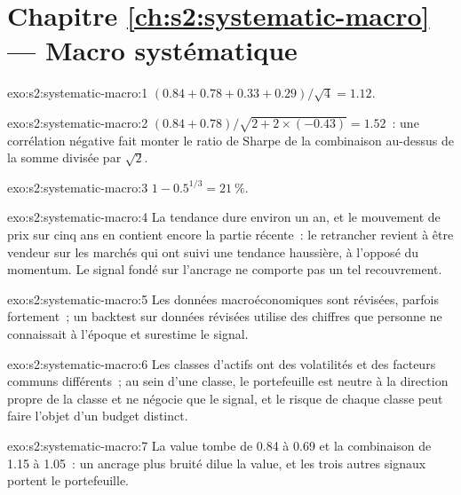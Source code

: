 \section*{Chapitre \ref{ch:s2:systematic-macro} --- Macro systématique}

\begin{solution}{exo:s2:systematic-macro:1}
$(0.84 + 0.78 + 0.33 + 0.29)/\sqrt4 = 1.12$.
\end{solution}

\begin{solution}{exo:s2:systematic-macro:2}
$(0.84 + 0.78)/\sqrt{2 + 2 \times (-0.43)} = 1.52$~: une corrélation négative fait monter le ratio de Sharpe de la combinaison au-dessus de la somme divisée par $\sqrt2$.
\end{solution}

\begin{solution}{exo:s2:systematic-macro:3}
$1 - 0.5^{1/3} = 21~\%$.
\end{solution}

\begin{solution}{exo:s2:systematic-macro:4}
La tendance dure environ un an, et le mouvement de prix sur cinq ans en contient encore la partie récente~: le retrancher revient à être vendeur sur les marchés qui ont suivi une tendance haussière,
à l'opposé du momentum. Le signal fondé sur l'ancrage ne comporte pas un tel recouvrement.
\end{solution}

\begin{solution}{exo:s2:systematic-macro:5}
Les données macroéconomiques sont révisées, parfois fortement~; un backtest sur données révisées utilise des chiffres que personne ne connaissait à l'époque et surestime le signal.
\end{solution}

\begin{solution}{exo:s2:systematic-macro:6}
Les classes d'actifs ont des volatilités et des facteurs communs différents~; au sein d'une classe, le portefeuille est neutre à la direction propre de la classe et ne négocie que le
signal, et le risque de chaque classe peut faire l'objet d'un budget distinct.
\end{solution}

\begin{solution}{exo:s2:systematic-macro:7}
La value tombe de 0.84 à 0.69 et la combinaison de 1.15 à 1.05~: un ancrage plus bruité dilue la value, et les trois autres signaux portent le portefeuille.
\end{solution}

